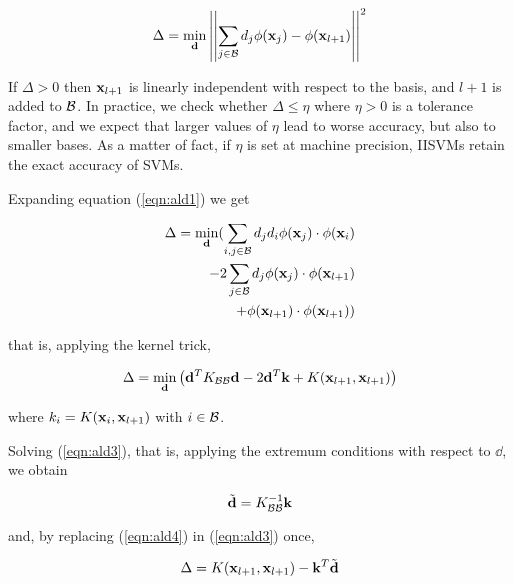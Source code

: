 \begin{equation} \label{eqn:ald1}
  \Delta = \min_{\mathbf{d}} \left|\left|\sum_{j \in \mathcal{B}} d_j \phi(\mathbf{x}_j) - \phi(\mathbf{x}_{l+1}) \right|\right|^2
\end{equation}

If $\Delta > 0$ then $\mathbf{x}_{l+1}$ is linearly independent with respect
to the basis, and $l+1$ is added to $\mathcal{B}$. In practice, we check
whether $\Delta \leq \eta$ where $\eta > 0$ is a tolerance factor, and
we expect that larger values of $\eta$ lead to worse accuracy, but also
to smaller bases. As a matter of fact, if $\eta$ is set at machine
precision, IISVMs retain the exact accuracy of SVMs.

Expanding equation (\ref{eqn:ald1}) we get

\begin{eqnarray} \label{eqn:ald2}
  \Delta = \min_{\mathbf{d}} (
      \sum_{i,j \in \mathcal{B}} d_j d_i \phi(\mathbf{x}_j) \cdot \phi(\mathbf{x}_i) \\
    - 2\sum_{j \in \mathcal{B}} d_j \phi(\mathbf{x}_j) \cdot \phi(\mathbf{x}_{l+1}) \nonumber \\
    + \phi(\mathbf{x}_{l+1}) \cdot \phi(\mathbf{x}_{l+1}) ) \nonumber
\end{eqnarray}

that is, applying the kernel trick,

\begin{equation} \label{eqn:ald3}
  \Delta = \min_{\mathbf{d}} \left(
      \mathbf{d}^T K_{\mathcal{B}\mathcal{B}}\mathbf{d}
    - 2 \mathbf{d}^T \mathbf{k}
    + K(\mathbf{x}_{l+1},\mathbf{x}_{l+1})
  \right)
\end{equation}

where $k_i = K(\mathbf{x}_i,\mathbf{x}_{l+1})$ with $i \in \mathcal{B}$.

Solving (\ref{eqn:ald3}), that is, applying the extremum conditions
with respect to $\dd$, we obtain

\begin{equation} \label{eqn:ald4}
  \tilde{\mathbf{d}} = K_{\mathcal{B}\mathcal{B}}^{-1} \mathbf{k} \\
\end{equation}

and, by replacing (\ref{eqn:ald4}) in (\ref{eqn:ald3}) once,

\begin{equation} \label{eqn:ald5}
  \Delta = K(\mathbf{x}_{l+1},\mathbf{x}_{l+1}) - \mathbf{k}^T \tilde{\mathbf{d}}
\end{equation}

